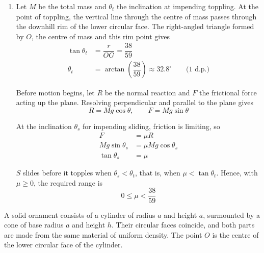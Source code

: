 \documentclass[leqno]{article}
\begin{document}
\begin{enumerate}[
  label=\textbf{\arabic*.},
  leftmargin=*,
  topsep=0pt,
  partopsep=0pt,
  parsep=0pt
]
\begin{djsSolution}
\begin{enumerate}[label=\textbf{(\alph*)}, start=1]
For a composite solid, the centre of mass satisfies
\[
M\bar{x}=\sum m_ix_i
\]

where \(M=\sum m_i\) is the total mass. Here \(\bar{x}=OG\). Using the masses and heights above:
\begin{align*}
(m_c+m_h)OG&=m_cx_c+m_hx_h\\
\left(\rho\pi r^3+\dfrac{16}{3}\rho\pi r^3\right)OG&=\rho\pi r^3\left(\dfrac r2\right)+\dfrac{16}{3}\rho\pi r^3\left(\dfrac{7r}{4}\right)\\
\left(1+\dfrac{16}{3}\right)OG&=\left(\dfrac12+\dfrac{28}{3}\right)r\\
OG&=\dfrac{59r}{38}
\end{align*}

\item
Let \(M\) be the total mass and \(\theta_t\) the inclination at impending toppling. At the point of toppling, the vertical line through the centre of mass passes through the downhill rim of the lower circular face. The right-angled triangle formed by \(O\), the centre of mass and this rim point gives
\begin{align*}
\tan\theta_t&=\dfrac{r}{OG}=\dfrac{38}{59}\\
\theta_t&=\arctan\left(\dfrac{38}{59}\right)\approx32.8^\circ\qquad\text{(1 d.p.)}
\end{align*}

Before motion begins, let \(R\) be the normal reaction and \(F\) the frictional force acting up the plane. Resolving perpendicular and parallel to the plane gives
\[
R=Mg\cos\theta,\qquad F=Mg\sin\theta
\]

At the inclination \(\theta_s\) for impending sliding, friction is limiting, so
\begin{align*}
F&=\mu R\\
Mg\sin\theta_s&=\mu Mg\cos\theta_s\\
\tan\theta_s&=\mu
\end{align*}

\(S\) slides before it topples when \(\theta_s<\theta_t\), that is, when \(\mu<\tan\theta_t\). Hence, with \(\mu\geq0\), the required range is
\[
0\leq\mu<\dfrac{38}{59}
\]

\end{enumerate}
\end{djsSolution}

\newpage

\questionitem

A solid ornament consists of a cylinder of radius $a$ and height $a$, surmounted by a cone of base radius $a$ and height $h$. Their circular faces coincide, and both parts are made from the same material of uniform density. The point $O$ is the centre of the lower circular face of the cylinder. \\


\end{enumerate}
\end{document}
